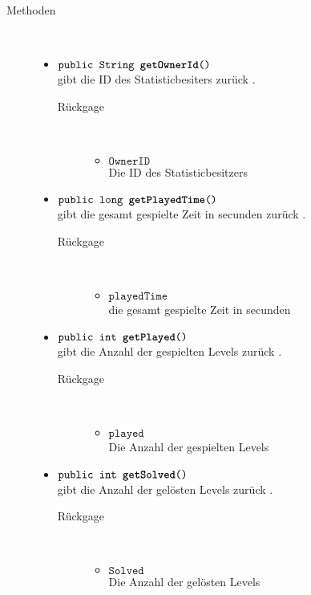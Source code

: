 \begin{description}
		\item[Methoden] \hfill \\
			\vspace{-.8cm}
			\begin{itemize}
			\item $\texttt{public  String \textbf{getOwnerId}()}$ \\ gibt die ID des Statisticbesiters zurück .
				\begin{description}
				\item[Rückgage] \hfill \\
					\vspace{-.8cm}
					\begin{itemize}
						\item $\texttt{OwnerID }$ \\Die ID des Statisticbesitzers 					\end{itemize}	
					\end{description}
				\item $\texttt{public  long \textbf{getPlayedTime}()}$ \\ gibt die gesamt gespielte Zeit in secunden zurück .
				\begin{description}
				\item[Rückgage] \hfill \\
					\vspace{-.8cm}
					\begin{itemize}
						\item $\texttt{playedTime }$ \\die gesamt gespielte Zeit in secunden 
					\end{itemize}	
					\end{description}
					\item $\texttt{public  int \textbf{getPlayed}()}$ \\ gibt die Anzahl der gespielten Levels zurück .
				\begin{description}
				\item[Rückgage] \hfill \\
					\vspace{-.8cm}
					\begin{itemize}
						\item $\texttt{played }$ \\Die Anzahl der gespielten Levels
					\end{itemize}	
					\end{description}
					\item $\texttt{public  int \textbf{getSolved}()}$ \\ gibt die Anzahl der gelösten Levels zurück .
				\begin{description}
				\item[Rückgage] \hfill \\
					\vspace{-.8cm}
					\begin{itemize}
						\item $\texttt{Solved }$ \\Die Anzahl der gelösten Levels
					\end{itemize}	
					\end{description}
			

\end{itemize}
\end{description}
